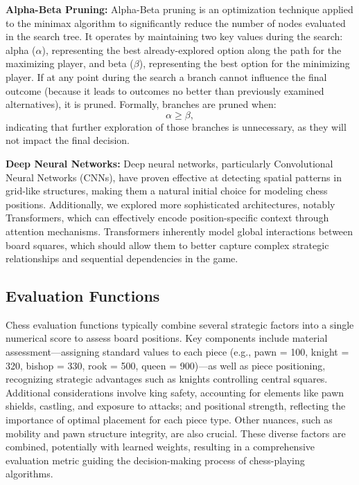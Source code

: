\documentclass[journal, a4paper]{IEEEtran}
\begin{document}
\noindent \textbf{Alpha-Beta Pruning:} 
Alpha-Beta pruning is an optimization technique applied to the minimax algorithm to significantly reduce the number of nodes evaluated in the search tree. It operates by maintaining two key values during the search: alpha ($\alpha$), representing the best already-explored option along the path for the maximizing player, and beta ($\beta$), representing the best option for the minimizing player. If at any point during the search a branch cannot influence the final outcome (because it leads to outcomes no better than previously examined alternatives), it is pruned. Formally, branches are pruned when:
\[
\alpha \geq \beta,
\]
indicating that further exploration of those branches is unnecessary, as they will not impact the final decision.

\noindent \textbf{Deep Neural Networks:}
Deep neural networks, particularly Convolutional Neural Networks (CNNs), have proven effective at detecting spatial patterns in grid-like structures, making them a natural initial choice for modeling chess positions. 
Additionally, we explored more sophisticated architectures, notably Transformers, which can effectively encode position-specific context through attention mechanisms. Transformers inherently model global interactions between board squares, which should allow them to better capture complex strategic relationships and sequential dependencies in the game.

\subsection{Evaluation Functions}
\noindent Chess evaluation functions typically combine several strategic factors into a single numerical score to assess board positions. Key components include material assessment—assigning standard values to each piece (e.g., pawn = 100, knight = 320, bishop = 330, rook = 500, queen = 900)—as well as piece positioning, recognizing strategic advantages such as knights controlling central squares. Additional considerations involve king safety, accounting for elements like pawn shields, castling, and exposure to attacks; and positional strength, reflecting the importance of optimal placement for each piece type. Other nuances, such as mobility and pawn structure integrity, are also crucial. These diverse factors are combined, potentially with learned weights, resulting in a comprehensive evaluation metric guiding the decision-making process of chess-playing algorithms.
\end{document}
